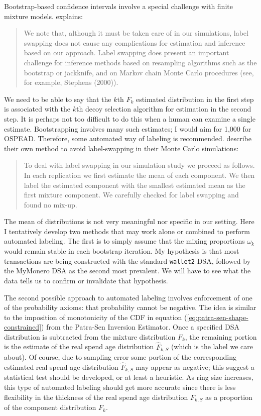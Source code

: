 \documentclass[english]{article}
\begin{document}
Bootstrap-based confidence intervals involve a special challenge with
finite mixture models. \cite{Bonhomme2016} explains:
\begin{quote}
We note that, although it must be taken care of in our simulations,
label swapping does not cause any complications for estimation and
inference based on our approach. Label swapping does present an important
challenge for inference methods based on resampling algorithms such
as the bootstrap or jackknife, and on Markov chain Monte Carlo procedures
(see, for example, Stephens (2000)).
\end{quote}
We need to be able to say that the $k$th $F_{k}$ estimated distribution
in the first step is associated with the $k$th decoy selection algorithm
for estimation in the second step. It is perhaps not too difficult
to do this when a human can examine a single estimate. Bootstrapping
involves many such estimates; I would aim for 1,000 for OSPEAD. Therefore,
some automated way of labeling is recommended. \cite{Bonhomme2016}
describe their own method to avoid label-swapping in their Monte Carlo
simulations:
\begin{quote}
To deal with label swapping in our simulation study we proceed as
follows. In each replication we first estimate the mean of each component.
We then label the estimated component with the smallest estimated
mean as the first mixture component. We carefully checked for label
swapping and found no mix-up.
\end{quote}
The mean of distributions is not very meaningful nor specific in our
setting. Here I tentatively develop two methods that may work alone
or combined to perform automated labeling. The first is to simply
assume that the mixing proportions $\omega_{k}$ would remain stable
in each bootstrap iteration. My hypothesis is that most transactions
are being constructed with the standard \texttt{wallet2} DSA, followed
by the MyMonero DSA as the second most prevalent. We will have to
see what the data tells us to confirm or invalidate that hypothesis.

The second possible approach to automated labeling involves enforcement
of one of the probability axioms: that probability cannot be negative.
The idea is similar to the imposition of monotonicity of the CDF in
equation (\ref{eq:patra-sen-shape-constrained}) from the Patra-Sen
Inversion Estimator. Once a specified DSA distribution is subtracted
from the mixture distribution $F_{k}$, the remaining portion is the
estimate of the real spend age distribution $\hat{F}_{k,S}$ (which
is the label we care about). Of course, due to sampling error some
portion of the corresponding estimated real spend age distribution
$\hat{F}_{k,S}$ may appear as negative; this suggest a statistical
test should be developed, or at least a heuristic. As ring size increases,
this type of automated labeling should get more accurate since there
is less flexibility in the thickness of the real spend age distribution
$F_{k,S}$ as a proportion of the component distribution $F_{k}$.
\end{document}

